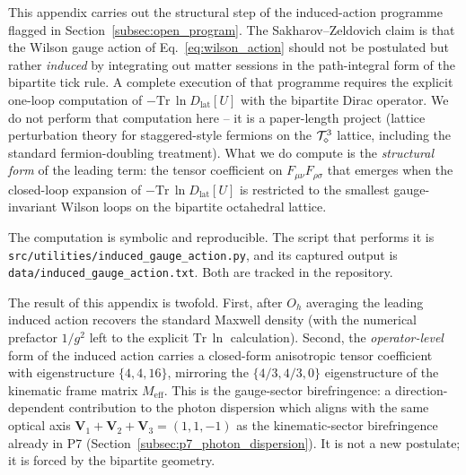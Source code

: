 
\label{sec:induced_gauge_action}

This appendix carries out the structural step of the induced-action
programme flagged in
Section~\ref{subsec:open_program}.
The Sakharov--Zeldovich claim is that the Wilson gauge action of
Eq.~\eqref{eq:wilson_action} should not be postulated but rather
\emph{induced} by integrating out matter sessions in the path-integral
form of the bipartite tick rule.  A complete execution of that
programme requires the explicit one-loop computation of
$-\mathrm{Tr}\,\ln D_\text{lat}[U]$ with the bipartite Dirac operator.
We do not perform that computation here -- it is a paper-length
project (lattice perturbation theory for staggered-style fermions on
the $\mathcal{T}_\diamond^3$ lattice, including the standard fermion-doubling
treatment).  What we do compute is the \emph{structural form} of the
leading term: the tensor coefficient on $F_{\mu\nu} F_{\rho\sigma}$
that emerges when the closed-loop expansion of
$-\mathrm{Tr}\,\ln D_\text{lat}[U]$ is restricted to the smallest
gauge-invariant Wilson loops on the bipartite octahedral lattice.

The computation is symbolic and reproducible.  The script that
performs it is\\
\nolinkurl{src/utilities/induced_gauge_action.py},
and its captured output is\\
\nolinkurl{data/induced_gauge_action.txt}.
Both are tracked in the repository.

The result of this appendix is twofold.  First, after $O_h$ averaging
the leading induced action recovers the standard Maxwell density
(with the numerical prefactor $1/g^2$ left to the explicit
$\mathrm{Tr}\,\ln$ calculation).  Second, the \emph{operator-level}
form of the induced action carries a closed-form anisotropic tensor
coefficient with eigenstructure $\{4,4,16\}$, mirroring the
$\{4/3, 4/3, 0\}$ eigenstructure of the kinematic frame matrix
$M_\text{eff}$.  This is the gauge-sector birefringence: a
direction-dependent contribution to the photon dispersion which
aligns with the same optical axis $\mathbf{V}_1+\mathbf{V}_2+\mathbf{V}_3
= (1, 1, -1)$ as the kinematic-sector birefringence already in P7
(Section~\ref{subsec:p7_photon_dispersion}).
It is not a new postulate; it is forced by the bipartite geometry.

